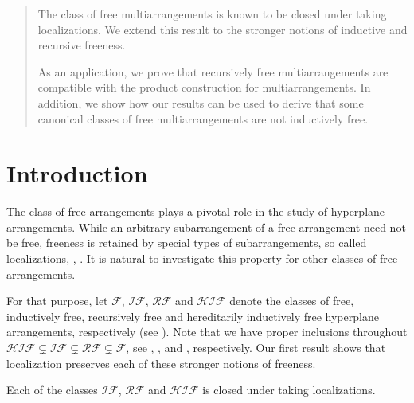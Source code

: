 \allowdisplaybreaks

\begin{abstract}
The class of free multiarrangements
is known to be closed under taking localizations.
We extend this result to the stronger notions of inductive 
and recursive freeness.

As an application, we prove that 
recursively free multiarrangements 
are compatible with the product 
construction for multiarrangements.
In addition, we show how our results 
can be used to derive that
some canonical classes of free multiarrangements 
are not inductively free.
\end{abstract}

\maketitle

\section{Introduction}

The class of free arrangements plays a pivotal role 
in the study of hyperplane arrangements.
While an arbitrary subarrangement of a free arrangement
need not be free, freeness is retained by 
special types of subarrangements, so called localizations, 
\cite{terao:freefinitefields},
\cite[Thm.\ 4.37]{orlikterao:arrangements}.
It is natural to investigate this property for other 
classes of free arrangements.

For that purpose, let ${{\mathcal F}}$, ${{\mathcal {IF}}}$, ${{\mathcal {RF}}}$ and ${{\mathcal {HIF}}}$ denote the classes of 
free, inductively free, recursively free and 
hereditarily inductively free hyperplane arrangements, respectively
(see \cite[Defs.\ 4.53, 4.60]{orlikterao:arrangements}).
Note that we have proper inclusions throughout 
${{\mathcal {HIF}}} \subsetneq {{\mathcal {IF}}} \subsetneq {{\mathcal {RF}}} \subsetneq {{\mathcal F}}$, see 
\cite[Ex.\ 2.16]{hogeroehrle:indfree}, 
\cite[Ex.\ 4.56]{orlikterao:arrangements}, and 
\cite[Rem.\ 3.7]{cuntzhoge}, respectively.
Our first result shows that localization
preserves each of these stronger notions of
freeness.

\begin{theorem}
\label{thm:local}
Each of the classes 
${{\mathcal {IF}}}$, ${{\mathcal {RF}}}$  and ${{\mathcal {HIF}}}$ 
is closed under taking localizations.
\end{theorem}

